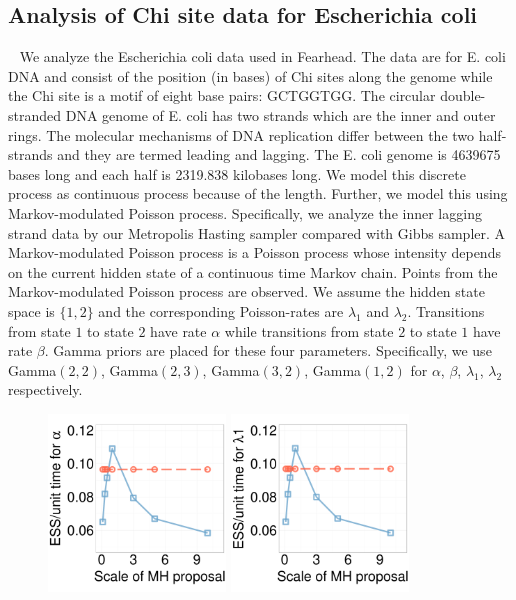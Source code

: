 {  \subsection{Analysis of Chi site data for Escherichia coli}~
  We analyze the Escherichia coli data used in Fearhead. The data are for E. coli DNA and consist of the position (in bases) of Chi sites along the genome while the Chi site is a motif of eight base pairs: GCTGGTGG. The circular double-stranded DNA genome of E. coli has two strands which are the inner and outer rings. The molecular mechanisms of DNA replication differ between the two half-strands and they are termed leading and lagging. The E. coli genome is 4639675 bases long and each half is 2319.838 kilobases long. We model this discrete process as continuous process because of the length. Further, we model this using Markov-modulated Poisson process. Specifically, we analyze the inner lagging strand data by our Metropolis Hasting sampler compared with Gibbs sampler. A Markov-modulated Poisson process is a Poisson process whose intensity depends on the current hidden state of a continuous time Markov chain. Points from the Markov-modulated Poisson process are observed. We assume the hidden state space is  $\{1, 2\}$ and the corresponding Poisson-rates are $\lambda_1$ and $\lambda_2$. Transitions from state $1$ to state $2$ have rate $\alpha$ while transitions from state $2$ to state $1$ have rate $\beta$. Gamma priors are placed for these four parameters. Specifically, we use Gamma$(2,2)$, Gamma$(2,3)$, Gamma$(3,2)$, Gamma$(1,2)$ for $\alpha$, $\beta$, $\lambda_1$, $\lambda_2$ respectively.
  \begin{figure}%
  \centering
  \begin{minipage}[!hp]{0.9\linewidth}
  \centering
    \includegraphics [width=0.42\textwidth, angle=0]{figs/ECOLI_alpha.pdf}
    \hspace{.2 in}
    \includegraphics [width=0.42\textwidth, angle=0]{figs/ECOLI_l1.pdf}

\end{minipage}
\end{figure}}
